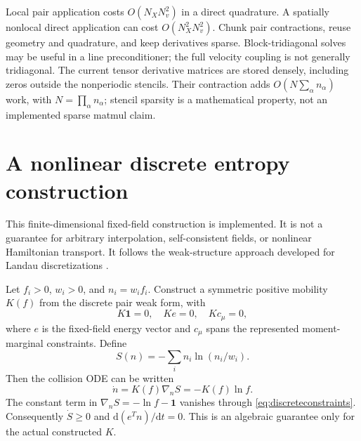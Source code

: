 \documentclass[11pt,letterpaper]{article}
\newcommand{\dd}{\mathrm d}
\begin{document}
Local pair application costs $O(N_XN_v^2)$ in a direct quadrature. A spatially
nonlocal direct application can cost $O(N_X^2N_v^2)$. Chunk pair contractions,
reuse geometry and quadrature, and keep derivatives sparse. Block-tridiagonal
solves may be useful in a line preconditioner; the full velocity coupling is not
generally tridiagonal.
The current tensor derivative matrices are stored densely, including zeros
outside the nonperiodic stencils. Their contraction adds
$O(N\sum_\alpha n_\alpha)$ work, with $N=\prod_\alpha n_\alpha$; stencil
sparsity is a mathematical property, not an implemented sparse matmul claim.

\section{A nonlinear discrete entropy construction}

This finite-dimensional fixed-field construction is implemented. It is not a
guarantee for arbitrary interpolation, self-consistent fields, or nonlinear
Hamiltonian transport. It follows the weak-structure approach developed for
Landau discretizations \cite{KH17,HBK18,H21,ZPH}.

Let $f_i>0$, $w_i>0$, and $n_i=w_if_i$. Construct a symmetric positive mobility
$K(f)$ from the discrete pair weak form, with
\begin{equation}
 K\bm1=0,\quad Ke=0,\quad Kc_\mu=0,
 \label{eq:discreteconstraints}
\end{equation}
where $e$ is the fixed-field energy vector and $c_\mu$ spans the represented
moment-marginal constraints. Define
\begin{equation}
 S(n)=-\sum_i n_i\ln(n_i/w_i).
\end{equation}
Then the collision ODE can be written
\begin{equation}
 \dot n=K(f)\nabla_nS=-K(f)\ln f.
 \label{eq:nonlinearode}
\end{equation}
The constant term in $\nabla_nS=-\ln f-\bm1$ vanishes through
\eqref{eq:discreteconstraints}. Consequently $\dot S\ge0$ and
$\dd(e^Tn)/\dd t=0$. This is an algebraic guarantee only for the actual
constructed $K$.
\end{document}
